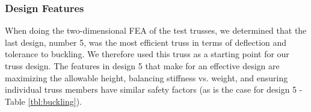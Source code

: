 \subsubsection{Design Features}

When doing the two-dimensional FEA of the test trusses, we determined that the last design, number 5, was the most efficient truss in terms of deflection and tolerance to buckling. 
We therefore used this truss as a starting point for our truss design. 
The features in design 5 that make for an effective design are maximizing the allowable height, balancing stiffness vs. weight, and ensuring individual truss members have similar safety factors (as is the case for design 5 - Table \ref{tbl:buckling}).   

